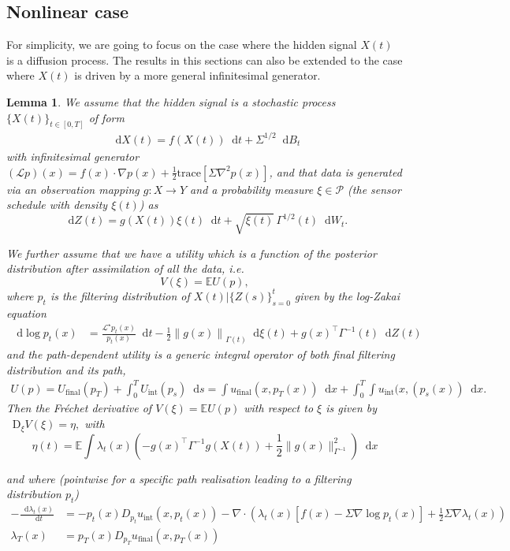 \documentclass[10pt]{article}
\numberwithin{equation}{section}
\numberwithin{figure}{section}
\newtheorem{lem}[thm]{Lemma}
\theoremstyle{remark}
\newcommand{\tr}{\mathrm{trace}}
\newcommand{\cP}{\mathcal P}
\newcommand{\cL}{\mathcal L}
\newcommand{\dd }{\mathop{}\!\mathrm{d}}
\newcommand{\DD }{\mathop{}\!\mathrm{D}}
\newcommand{\E}{\mathbb E}
\begin{document}
\subsection{Nonlinear case}
For simplicity, we are going to focus on the case where the hidden signal $X(t)$ is a diffusion process. The results in this sections can also be extended to the case where $X(t)$ is driven by a more general infinitesimal generator.
\begin{lem}\label{sec:main_lemma}
    We assume that the hidden signal is a stochastic process $\{X(t)\}_{t\in[0,T]}$ of form
    \begin{align*}
        \dd X(t) = f(X(t))\dd t + \Sigma^{1/2} \dd B_t 
    \end{align*}
    with infinitesimal generator $(\cL p)(x) = f(x) \cdot \nabla p(x) + \frac{1}{2}\tr[\Sigma \nabla^2 p(x)]$, and that data is generated via an observation mapping $g: X\to Y$ and a probability measure $\xi\in\cP$ (the sensor schedule with density $\xi(t)$) as
\begin{equation}
    \dd Z(t) = g(X(t))\xi(t)\dd t + \sqrt{\xi(t)}\,\Gamma^{1/2}(t)\dd W_t.
\end{equation}

We further assume that we have a utility which is a function of the posterior distribution after assimilation of all the data, i.e.
\begin{equation}
    V(\xi) = \E U(p),
\end{equation}
where $p_t$ is the filtering distribution of $X(t)|\{Z(s)\}_{s=0}^t$ given by the log-Zakai equation
\begin{align*}
    \dd \log p_t(x) &= \frac{\cL^\star  p_t(x)}{p_t(x)}\dd t - \frac{1}{2}\left\|g(x)\right\|_{\Gamma(t)}\dd\xi(t)+g(x)^\top \Gamma^{-1}(t)\dd  Z(t)
\end{align*}
and the path-dependent utility is a generic integral operator of both final filtering distribution and its path,
\begin{align*}
    U(p) = U_\mathrm{final}(p_T) + \int_0^T U_\mathrm{int}(p_s)\dd s = \int u_\mathrm{final}(x,p_T(x))\dd x +  \int_0^T \int u_\mathrm{int}(x,(p_s(x))\dd x.  
\end{align*}
Then the Fr\'echet derivative of $V(\xi)= \E U(p)$ with respect to $\xi$ is given by $\DD_\xi V(\xi) = \eta,$ with 
    \begin{equation} \label{eq:frechet_der}
        \eta(t) = \E\int   \lambda_t(x)  \left( - g(x)^\top \Gamma^{-1} g(X(t))    +\frac{1}{2} \| g(x)\|^2_{\Gamma^{-1}} \right) \dd x
    \end{equation}

    
    and where (pointwise for a specific path realisation leading to a filtering distribution $p_t$)
\begin{align}\label{eq:bwd_KS}
    -\frac{\dd\lambda_t(x)}{\dd t} &= -p_t(x) D_{p_t}u_\mathrm{int}(x,p_t(x)) -\nabla \cdot \left(\lambda_t(x) [f(x) -\Sigma \nabla \log p_t(x)] + \frac{1}{2} \Sigma \nabla \lambda_t(x) \right)\\
    \lambda_T(x) &= p_T(x) D_{p_T}u_\mathrm{final}(x,p_T(x))
\end{align}

\end{lem}
\end{document}
